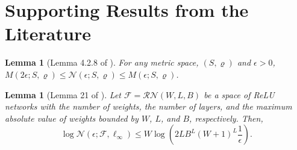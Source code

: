 \documentclass[12pts]{article}
\newtheorem{lemma}[defn]{Lemma}%
\newcommand{\cF}{ \mathcal{F}}
\newcommand{\cN}{ \mathcal{N}}
\newcommand{\cR}{ \mathcal{R}}
\begin{document}
\section{Supporting Results from the Literature}
\begin{lemma}[Lemma 4.2.8 of \citet{Vershynin_2026}]
     \label{cov_pack}For any metric space, $(S,\varrho)$ and $\epsilon>0$,
     $M(2\epsilon; S, \varrho) \le\cN(\epsilon; S, \varrho) \le M(\epsilon; S, \varrho)$.
 \end{lemma}
\begin{lemma}[Lemma 21 of \citet{JMLR:v21:20-002}]\label{lem_nakada} 
     Let $\cF = \cR\cN(W, L, B)$ be a space of ReLU networks with the number of weights, the number of layers, and the maximum absolute value of weights bounded by $W$, $L$, and $B$, respectively. Then,
\[
\log\cN(\epsilon; \cF, \ell_\infty) \leq W \log \left( 2LB^L(W + 1)^L \frac{1}{\epsilon} \right).
\]
 \end{lemma}

%
\end{document}
